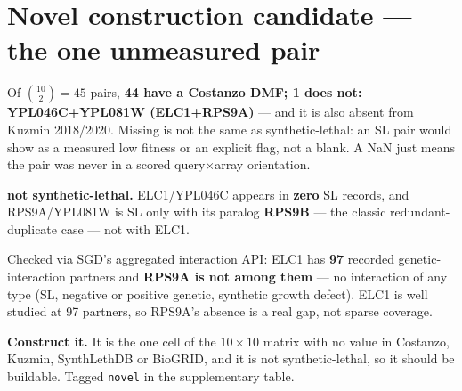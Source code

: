 \section{Novel construction candidate --- the one unmeasured pair}
\label{sec:novel}

Of $\binom{10}{2}=45$ pairs, \textbf{44 have a Costanzo DMF; 1 does not: YPL046C+YPL081W
(ELC1+RPS9A)} --- and it is also absent from Kuzmin 2018/2020. Missing is not the same as
synthetic-lethal: an SL pair would show as a measured low fitness or an explicit flag, not a
blank. A NaN just means the pair was never in a scored query$\times$array orientation.

 \textbf{not synthetic-lethal.}
ELC1/YPL046C appears in \textbf{zero} SL records, and RPS9A/YPL081W is SL only with its
paralog \textbf{RPS9B} --- the classic redundant-duplicate case --- not with ELC1.

 Checked via SGD's aggregated interaction API: ELC1 has
\textbf{97} recorded genetic-interaction partners and \textbf{RPS9A is not among them} --- no
interaction of any type (SL, negative or positive genetic, synthetic growth defect). ELC1 is
well studied at 97 partners, so RPS9A's absence is a real gap, not sparse coverage.

 \textbf{Construct it.} It is the one cell of the $10\times10$ matrix
with no value in Costanzo, Kuzmin, SynthLethDB or BioGRID, and it is not synthetic-lethal, so
it should be buildable. Tagged \texttt{novel} in the supplementary table.
